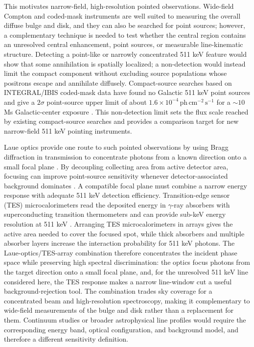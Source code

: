 \documentclass[pdflatex,sn-mathphys-num]{sn-jnl}
\newcommand{\phcms}{\,\mathrm{ph\,cm^{-2}\,s^{-1}}}
\begin{document}
This motivates narrow-field, high-resolution pointed observations. Wide-field Compton and coded-mask instruments are well suited to measuring the overall diffuse bulge and disk, and they can also be searched for point sources; however, a complementary technique is needed to test whether the central region contains an unresolved central enhancement, point sources, or measurable line-kinematic structure. Detecting a point-like or narrowly concentrated 511 keV feature would show that some annihilation is spatially localized; a non-detection would instead limit the compact component without excluding source populations whose positrons escape and annihilate diffusely. Compact-source searches based on INTEGRAL/IBIS coded-mask data have found no Galactic 511 keV point sources and give a $2\sigma$ point-source upper limit of about $1.6\times10^{-4}\phcms$ for a $\sim 10$ Ms Galactic-center exposure \cite{DeCesare2011}. This non-detection limit sets the flux scale reached by existing compact-source searches and provides a comparison target for new narrow-field 511 keV pointing instruments.

Laue optics provide one route to such pointed observations by using Bragg diffraction in transmission to concentrate photons from a known direction onto a small focal plane \cite{Barriere2009Laue,Barriere2011LauePrototype}. By decoupling collecting area from active detector area, focusing can improve point-source sensitivity whenever detector-associated background dominates \cite{Weidenspointner2006MAX}. A compatible focal plane must combine a narrow energy response with adequate 511 keV detection efficiency. Transition-edge sensor (TES) microcalorimeters read the deposited energy in $\gamma$-ray absorbers with superconducting transition thermometers and can provide sub-keV energy resolution at 511 keV \cite{Shirazi2023}. Arranging TES microcalorimeters in arrays gives the active area needed to cover the focused spot, while thick absorbers and multiple absorber layers increase the interaction probability for 511 keV photons. The Laue-optics/TES-array combination therefore concentrates the incident phase space while preserving high spectral discrimination: the optics focus photons from the target direction onto a small focal plane, and, for the unresolved 511 keV line considered here, the TES response makes a narrow line-window cut a useful background-rejection tool. The combination trades sky coverage for a concentrated beam and high-resolution spectroscopy, making it complementary to wide-field measurements of the bulge and disk rather than a replacement for them. Continuum studies or broader astrophysical line profiles would require the corresponding energy band, optical configuration, and background model, and therefore a different sensitivity definition.
\end{document}
